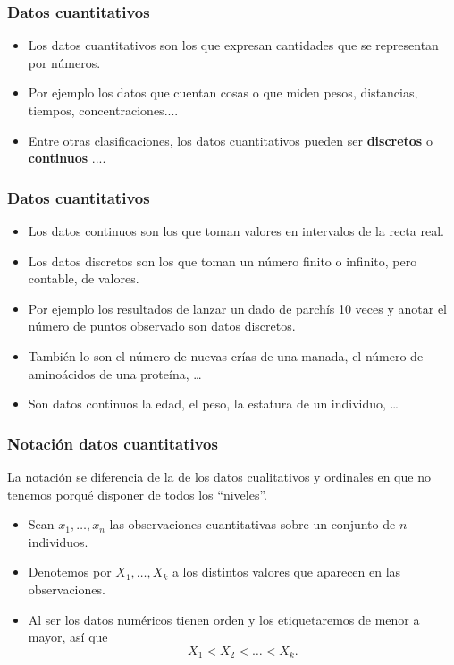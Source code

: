 \begin{frame}
\frametitle{Datos cuantitativos}
\begin{itemize}
\item  Los datos cuantitativos son los que expresan cantidades que se representan por números.
\item  Por ejemplo los datos que cuentan cosas o que miden pesos, distancias, tiempos, concentraciones....
\item  Entre otras clasificaciones, los datos cuantitativos pueden ser \textbf{discretos} o \textbf{continuos} ....
\end{itemize}
\end{frame}

\begin{frame}
\frametitle{Datos cuantitativos}
\begin{itemize}
\item  Los datos continuos son los que toman valores en intervalos de la recta real.
\item  Los datos  discretos son los que toman un número finito  o infinito, pero contable, de valores.
\item  Por ejemplo los resultados de lanzar un dado de parchís 10 veces y anotar el número de puntos observado 
 son datos discretos.
\item  También lo son el número de nuevas crías de una manada, el número de aminoácidos de una proteína, \ldots
\item  Son datos continuos la edad, el peso, la estatura de un individuo, \ldots 
\end{itemize}

\end{frame}

\begin{frame}
\frametitle{Notación datos cuantitativos}
La notación se diferencia de la de los datos cualitativos y ordinales en que no tenemos porqué disponer de todos los ``niveles''.
\begin{itemize}
\item Sean  $x_1,\ldots,x_n$ las observaciones  cuantitativas sobre un conjunto de $n$ individuos.
\item Denotemos por  $X_1,\ldots,X_k$  a los distintos valores que aparecen en las observaciones.
\item Al ser los datos  numéricos tienen orden y  los etiquetaremos de menor a mayor, así que 
$$X_1 < X_2 < \ldots < X_k.$$
\end{itemize}
\end{frame}

